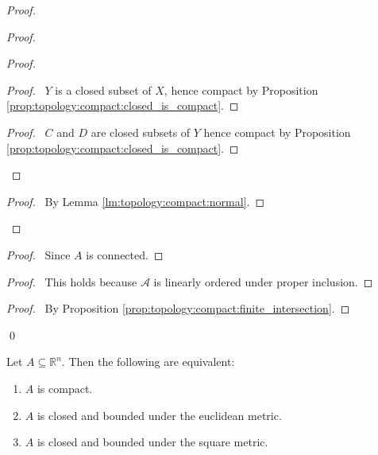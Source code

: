 \begin{proof}
  \pf
  \begin{proof}
    \begin{proof}
      \begin{proof}
        \pf\ $Y$ is a closed subset of $X$, hence compact by Proposition
        \ref{prop:topology:compact:closed_is_compact}.
      \end{proof}
      \qedstep
      \begin{proof}
        \pf\ $C$ and $D$ are closed subsets of $Y$ hence compact by
        Proposition \ref{prop:topology:compact:closed_is_compact}.
      \end{proof}
    \end{proof}
    \qedstep
    \begin{proof}
      \pf\ By Lemma \ref{lm:topology:compact:normal}.
    \end{proof}
  \end{proof}
  \begin{proof}
    \pf\ Since $A$ is connected.
  \end{proof}
  \begin{proof}
    \pf\ This holds because $\mathcal{A}$ is linearly ordered under proper
    inclusion.
  \end{proof}
  \begin{proof}
    \pf\ By Proposition \ref{prop:topology:compact:finite_intersection}.
  \end{proof}
  \qed
\end{proof}

\begin{thm}
  Let $A \subseteq \mathbb{R}^n$. Then the following are equivalent:
  \begin{enumerate}
    \item $A$ is compact.
    \item $A$ is closed and bounded under the euclidean metric.
    \item $A$ is closed and bounded under the square metric.
  \end{enumerate}
\end{thm}

